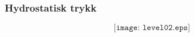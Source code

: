 \documentclass[aspectratio=169,xcolor=dvipsnames]{beamer}
\begin{document}
%
%
%
\begin{frame}
	\frametitle{Hydrostatisk trykk}

$$\texttt{[image: level02.eps]}$$
\end{frame}
\end{document}
